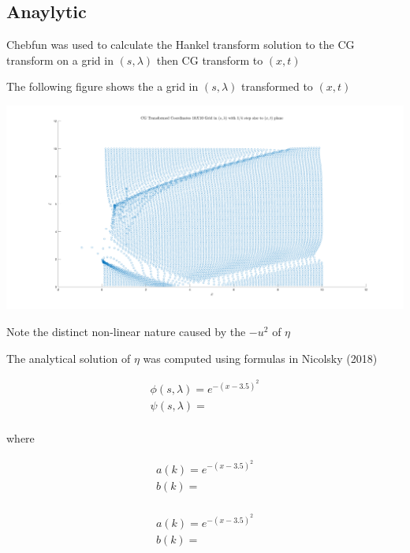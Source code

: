 \documentclass{article}
\begin{document}
\subsection{Anaylytic}

Chebfun was used to calculate the Hankel transform solution to the CG transform on a grid in $(s,\lambda)$ then CG transform to $(x,t)$

\noindent The following figure shows the a grid in $(s,\lambda)$ transformed to $(x,t)$

\includegraphics[width=\linewidth]{images/scatter.png} 

\noindent Note the distinct non-linear nature caused by the $-u^2$ of $\eta$

\noindent The analytical solution of $\eta$ was computed using formulas in Nicolsky (2018)

\[
\begin{aligned}
\phi (s, \lambda ) = e^{-(x-3.5)^2} \\
\psi (s, \lambda ) =  \\
\end{aligned}
\]

where

\[
\begin{aligned}
a(k) = e^{-(x-3.5)^2} \\
b(k) =  \\
\end{aligned}
\]

\[
\begin{aligned}
a(k) = e^{-(x-3.5)^2} \\
b(k) =  \\
\end{aligned}
\]
\end{document}
